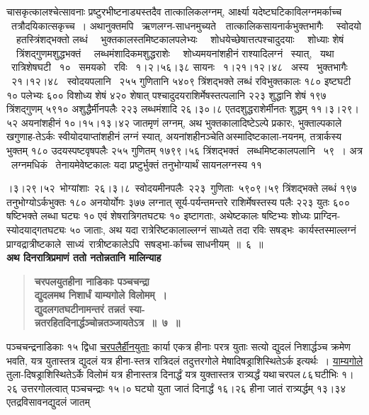 \documentclass[11pt, openany]{book}
\begin{document}
\newpage

\noindent चासकृत्कालश्चेत्सावनाः \;प्रष्टुरभीष्टनाड्यस्तदैव \;तात्कालिकलग्नम्, \;आर्क्ष्या यदेष्टघटिकाविलग्नमर्काच्च ~तत्रौदयिकात्सकृच्च~। अथानुक्तमपि ~ऋणलग्न-साधनमुच्यते\textendash ~~तात्कालिकसायनार्कभुक्तभागैः ~~स्वोदयो ~~हतस्त्रिंशद्भक्तो लब्धं ~~भुक्तकालस्तमिष्टकालपलेभ्यः ~~शोधयेच्छेषात्तत्पश्चादुदयाः ~~शोध्याः शेषं ~~त्रिंशद्गुणमशुद्धभक्तं ~~लब्धमंशादिकमशुद्धराशेः ~~शोध्यमयनांशहीनं राश्यादिलग्नं ~स्यात्, ~यथा ~रात्रिशेषघटी ~१० ~समयको ~रविः ~१।२।५६।३८ सायनः ~१।२१।१२।४८ ~अस्य ~भुक्तभागैः ~२१।१२।४८ ~स्वोदयपलानि ~२५५ गुणितानि ५४०९ त्रिंशद्भक्ते लब्धं रविभुक्तकालः १८० इष्टघटी १० पलेभ्यः ६०० विशोध्य शेषं ४२० शेषात् पश्चादुदयराशिर्मेषस्तत्पलानि २२३ शुद्धानि शेषं \;१९७ \;त्रिंशद्गुणम् \;५९१० \;अशुद्धैर्मीनपलैः \;२२३ \;लब्धमंशादि \;२६।३०।८ एतदशुद्धराशेर्मीनतः \;शुद्धम् \;११।३।२९।५२ \;अयनांशहीनं \;१०।१५।१३।४२ जातमृणं लग्नम्, अथ भुक्तकालादिष्टेऽल्पे प्रकारः, भुक्ताल्पकाले खगुणाह-तेऽर्कः स्वीयोदयाप्तांशहीनं लग्नं स्यात्, अयनांशहीनञ्चेति\textendash \,अस्मादिष्टकाला-नयनम्, तत्रार्कस्य भुक्तम् १८० उदयस्पष्टवृषपलैः २५५ गुणितम् १७९९।५६ त्रिंशद्भक्तं ~लब्धमिष्टकालपलानि ~५९~। अत्र ~लग्नमधिकं ~तेनायमेवेष्टकालः यदा प्रष्टुर्भुक्तं तनुभोग्यार्थं सायनलग्नस्य ११
 
\newpage

\noindent ।३।२९।५२ \,भोग्यांशाः \,२६।३।८ \,स्वोदयमीनपलैः \,२२३ \,गुणिताः \,५९०९।५९ त्रिंशद्भक्ते लब्धं १९७ तनुभोग्योऽर्कभुक्तः १८० अनयोर्योगः ३७७ लग्नात् सूर्य-पर्यन्तमन्तरे राशिर्मेषस्तस्य पलैः २२३ युतः ६०० षष्टिभक्ते लब्धा घट्यः १० एवं शेषरात्रिगतघट्यः १० इष्टागताः, अथेष्टकालः षष्टिभ्यः शोध्यः प्राग्दिन-स्योदयाद्गतघट्यः ५० जाताः, अथ यदा रात्रेरिष्टकालाल्लग्नं साध्यते तदा रविः सषड्भः \,कार्यस्तस्माल्लग्नं \,प्राग्वद्रात्रीष्टकाले \,साध्यं \,रात्रीष्टकालेऽपि \,सषड्भा-र्काच्च साधनीयम्~॥~६~॥\\

{\small \textbf{अथ दिनरात्रिप्रमाणं ततो नतोन्नतानि मालिन्याह\textendash }}

 \label{3.7}
\begin{quote}
{\large \textbf{{\color{purple}चरपलयुतहीना नाडिकाः पञ्चचन्द्रा \\
द्युदलमथ निशार्धं याम्यगोले विलोमम्~। \\
द्युदलगतघटीनामन्तरं तन्नतं स्या-\\
न्नतरहितदिनार्द्धञ्चोन्नतञ्जायतेऽत्र~॥~७~॥}}}
\end{quote}

पञ्चचन्द्रनाडिकाः १५ द्विधा \hyperref[3.7]{चरपलैर्हीनयुताः} कार्या एकत्र हीनाः परत्र युताः सत्यो द्युदलं निशार्द्धञ्च क्रमेण भवति, यत्र युतास्तत्र द्युदलं यत्र हीना-स्तत्र रात्रिदलं तदुत्तरगोले मेषादिषड्राशिस्थितेऽर्क इत्यर्थः~। \hyperref[3.7]{याम्यगोले} तुला-दिषड्राशिस्थितेऽर्के विलोमं यत्र हीनास्तत्र दिनार्द्धं यत्र युक्तास्तत्र रात्र्यर्द्धं यथा\textendash \,चरपल\textendash \,८६\textendash \,घटीभिः १।२६ उत्तरगोलत्वात् पञ्चचन्द्राः १५।० घट्यो युता जातं दिनार्द्धं १६।२६ हीना जातं रात्र्यर्द्धम् १३।३४ एतद्रविसावनद्युदलं जातम्
\end{document}
